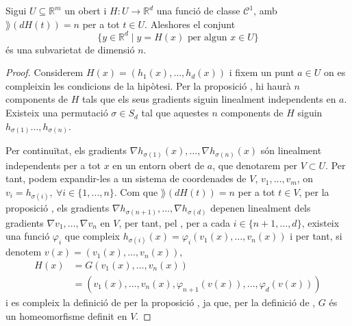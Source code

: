 \documentclass[../Apunts.tex]{subfiles}
\begin{document}
	\begin{theorem}
		\label{thm:Teorema del rang constant}
		Sigui \(U\subseteq\mathbb{R}^{m}\) un obert i \(H\colon U\to\mathbb{R}^{d}\) una funció de classe \(\mathcal{C}^{1}\), amb \(\rang(dH(t))=n\) per a tot \(t\in U\).
		Aleshores el conjunt
		\[\{y\in\mathbb{R}^{d}\mid y=H(x)\text{ per algun }x\in U\}\]
		és una subvarietat de dimensió \(n\).
		\begin{proof}
			Considerem \(H(x)=(h_{1}(x),\dots,h_{d}(x))\) i fixem un punt \(a\in U\) on es compleixin les condicions de la hipòtesi. Per la proposició , hi haurà \(n\) components de \(H\) tals que els seus gradients siguin linealment independents en \(a\). Existeix una permutació \(\sigma\in S_{d}\) tal que aquestes \(n\) components de \(H\) siguin \(h_{\sigma(1)}\dots,h_{\sigma(n)}\).
			
			Per continuïtat, els gradients \(\nabla h_{\sigma(1)}(x),\dots,\nabla h_{\sigma(n)}(x)\) són linealment independents per a tot \(x\) en un entorn obert de \(a\), que denotarem per \(V\subset U\). Per tant, podem expandir-les a un sistema de coordenades de \(V\), \(v_{1},\dots,v_{m}\), on \(v_{i}=h_{\sigma(i)},\ \forall i\in\{1,\dots,n\}\). Com que \(\rang(dH(t))=n\) per a tot \(t\in V\), per la proposició , els gradients \(\nabla h_{\sigma(n+1)},\dots,\nabla h_{\sigma(d)}\) depenen linealment dels gradients \(\nabla v_{1},\dots,\nabla v_{n}\) en \(V\), per tant, pel \corollari{} , per a cada \(i\in\{n+1,\dots,d\}\), existeix una funció \(\varphi_{i}\) que compleix \(h_{\sigma(i)}(x)=\varphi_{i}(v_{1}(x),\dots,v_{n}(x))\) i per tant, si denotem \(v(x)=(v_{1}(x),\dots,v_{n}(x))\),
			\begin{align*}
			H(x)&=G(v_{1}(x),\dots,v_{n}(x))\\
			&=(v_{1}(x),\dots,v_{n}(x),\varphi_{n+1}(v(x)),\dots,\varphi_{d}(v(x)))
			\end{align*}
			i es compleix la definició de  per la proposició , ja que, per la definició de , \(G\) és un homeomorfisme definit en \(V\). %
		\end{proof}
	\end{theorem}
\end{document}
